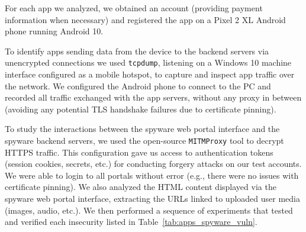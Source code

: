 For each app we analyzed, we obtained an account (providing payment
information when necessary) and registered the app on a Pixel 2 XL
Android phone running Android 10.

To identify apps sending data from the device to the backend servers via unencrypted connections we used \texttt{tcpdump},
listening on a Windows 10 machine interface configured as a mobile
hotspot, to capture and inspect app traffic over the network.  We
configured the Android phone to connect to the PC and recorded all
traffic exchanged with the app servers, without any proxy in between
(avoiding any potential TLS handshake failures due to certificate
pinning).

To study the interactions between the spyware web portal interface and
the spyware backend servers, we used the open-source \texttt{MITMProxy} tool to
decrypt HTTPS traffic.  This configuration gave us access to
authentication tokens (session cookies, secrets, etc.) for conducting
forgery attacks on our test accounts.  We were able to login to all
portals without error (e.g., there were no issues with certificate
pinning).  We also analyzed the HTML content displayed via the spyware
web portal interface, extracting the URLs linked to uploaded user
media (images, audio, etc.).  We then performed a sequence of
experiments that tested and verified each insecurity listed in
Table~\ref{tab:apps_spyware_vuln}.




